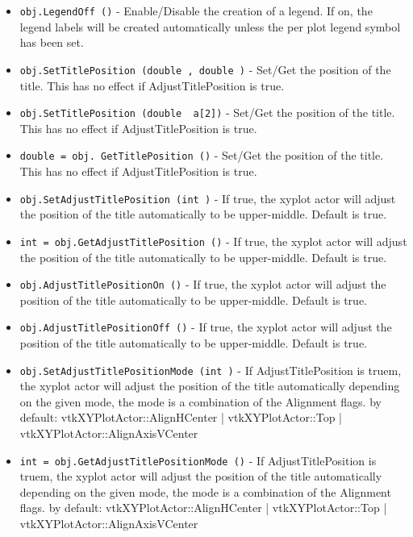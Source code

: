 \begin{itemize}
\item  \verb|obj.LegendOff ()| -  Enable/Disable the creation of a legend. If on, the legend labels will
 be created automatically unless the per plot legend symbol has been
 set.

\item  \verb|obj.SetTitlePosition (double , double )| -  Set/Get the position of the title. This has no effect if 
 AdjustTitlePosition is true.

\item  \verb|obj.SetTitlePosition (double  a[2])| -  Set/Get the position of the title. This has no effect if 
 AdjustTitlePosition is true.

\item  \verb|double = obj. GetTitlePosition ()| -  Set/Get the position of the title. This has no effect if 
 AdjustTitlePosition is true.

\item  \verb|obj.SetAdjustTitlePosition (int )| -  If true, the xyplot actor will adjust the position of the title
 automatically to be upper-middle. Default is true.

\item  \verb|int = obj.GetAdjustTitlePosition ()| -  If true, the xyplot actor will adjust the position of the title
 automatically to be upper-middle. Default is true.

\item  \verb|obj.AdjustTitlePositionOn ()| -  If true, the xyplot actor will adjust the position of the title
 automatically to be upper-middle. Default is true.

\item  \verb|obj.AdjustTitlePositionOff ()| -  If true, the xyplot actor will adjust the position of the title
 automatically to be upper-middle. Default is true.

\item  \verb|obj.SetAdjustTitlePositionMode (int )| -  If AdjustTitlePosition is truem, the xyplot actor will
 adjust the position of the title automatically depending on the
 given mode, the mode is a combination of the Alignment flags.
 by default: vtkXYPlotActor::AlignHCenter | vtkXYPlotActor::Top
 | vtkXYPlotActor::AlignAxisVCenter 

\item  \verb|int = obj.GetAdjustTitlePositionMode ()| -  If AdjustTitlePosition is truem, the xyplot actor will
 adjust the position of the title automatically depending on the
 given mode, the mode is a combination of the Alignment flags.
 by default: vtkXYPlotActor::AlignHCenter | vtkXYPlotActor::Top
 | vtkXYPlotActor::AlignAxisVCenter 


\end{itemize}
